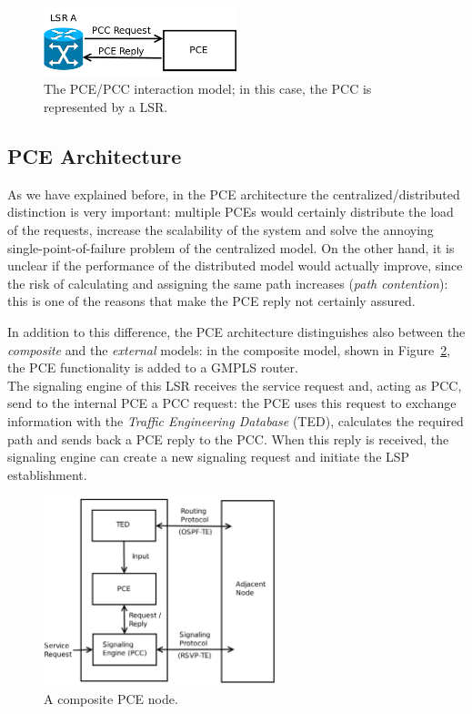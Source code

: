 \documentclass[10pt,a4paper]{report}
\begin{document}
\begin{figure}[!htbp]
  \centering
  \includegraphics[width=0.5\textwidth]{img/pce_pcc}
  \caption[PCE/PCC model]{The PCE/PCC interaction model; in this case,
    the PCC is represented by a LSR.}
  \label{fig:pce_pcc}
\end{figure}

\subsection{PCE Architecture}
As we have explained before, in the PCE architecture the
centralized/distributed distinction is very important: multiple PCEs
would certainly distribute the load of the requests, increase the
scalability of the system and solve the annoying
single-point-of-failure problem of the centralized model. On the other
hand, it is unclear if the performance of the distributed model would
actually improve, since the risk of calculating and assigning the same
path increases (\textit{path contention}): this is one of the reasons
that make the PCE reply not certainly assured.

In addition to this difference, the PCE architecture distinguishes
also between the \textit{composite} and the \textit{external} models:
in the composite model, shown in Figure~\ref{fig:pce_composite}, the
PCE functionality is added to a GMPLS router. \\
The signaling engine of this LSR receives the service request and,
acting as PCC, send to the internal PCE a PCC request: the PCE uses
this request to exchange information with the \textit{Traffic
  Engineering Database} (TED), calculates the required path and sends
back a PCE reply to the PCC\@. When this reply is received, the
signaling engine can create a new signaling request and initiate the
LSP establishment.

\begin{figure}[!htbp]
  \centering
  \includegraphics[width=0.6\textwidth]{img/pce_composite}
  \caption[Composite PCE model]{A composite PCE node.}
  \label{fig:pce_composite}
\end{figure}
\end{document}
